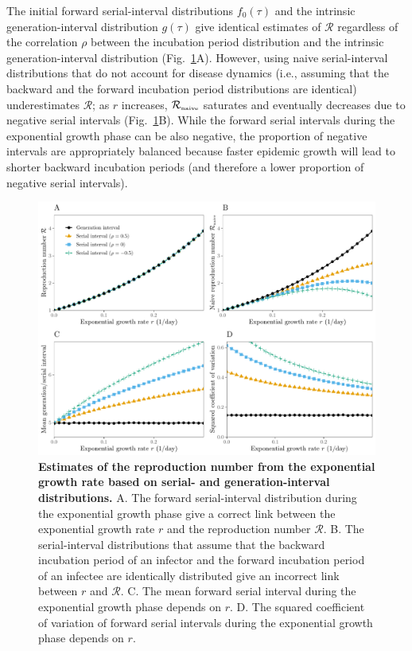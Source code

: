\documentclass[12pt]{article}
\newcommand{\fref}[1]{Fig.~\ref{fig:#1}}
\begin{document}
The initial forward serial-interval distributions $f_0(\tau)$ and the intrinsic generation-interval distribution $g(\tau)$ give identical estimates of $\mathcal R$ regardless of the correlation $\rho$ between the incubation period distribution and the intrinsic generation-interval distribution (\fref{rR}A).
However, using naive serial-interval distributions that do not account for disease dynamics (i.e., assuming that the backward and the forward incubation period distributions are identical) underestimates $\mathcal R$;
as $r$ increases, ${\mathcal R}_{\textrm{\tiny naive}}$ saturates and eventually decreases due to negative serial intervals (\fref{rR}B).
While the forward serial intervals during the exponential growth phase can be also negative, the proportion of negative intervals are appropriately balanced because faster epidemic growth will lead to shorter backward incubation periods (and therefore a lower proportion of negative serial intervals).

\begin{figure}[!th]
\includegraphics[width=\textwidth]{rR.pdf}
\caption{
\textbf{Estimates of the reproduction number from the exponential growth rate based on serial- and generation-interval distributions.}
A. The forward serial-interval distribution during the exponential growth phase give a correct link between the exponential growth rate $r$ and the reproduction number $\mathcal R$.
B. The serial-interval distributions that assume that the backward incubation period of an infector and the forward incubation period of an infectee are identically distributed give an incorrect link between $r$ and $\mathcal R$.
C. The mean forward serial interval during the exponential growth phase depends on $r$.
D. The squared coefficient of variation of forward serial intervals during the exponential growth phase depends on $r$.
}
\label{fig:rR}
\end{figure}
\end{document}
